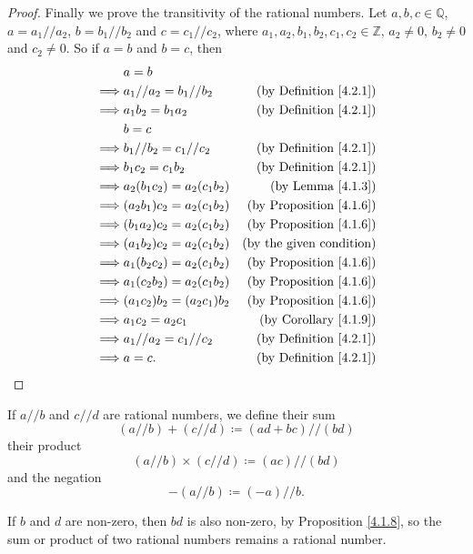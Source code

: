 \begin{proof}
Finally we prove the transitivity of the rational numbers.
Let \(a, b, c \in \mathds{Q}\), \(a = a_1 // a_2\), \(b = b_1 // b_2\) and \(c = c_1 // c_2\), where \(a_1, a_2, b_1, b_2, c_1, c_2 \in \mathds{Z}\), \(a_2 \neq 0\), \(b_2 \neq 0\) and \(c_2 \neq 0\).
So if \(a = b\) and \(b = c\), then
\begin{align*}
& a = b \\
\implies & a_1 // a_2 = b_1 // b_2 & \text{(by Definition \ref{4.2.1})} \\
\implies & a_1b_2 = b_1a_2 & \text{(by Definition \ref{4.2.1})} \\
& b = c \\
\implies & b_1 // b_2 = c_1 // c_2 & \text{(by Definition \ref{4.2.1})} \\
\implies & b_1c_2 = c_1b_2 & \text{(by Definition \ref{4.2.1})} \\
\implies & a_2(b_1c_2) = a_2(c_1b_2) & \text{(by Lemma \ref{4.1.3})} \\
\implies & (a_2b_1)c_2 = a_2(c_1b_2) & \text{(by Proposition \ref{4.1.6})} \\
\implies & (b_1a_2)c_2 = a_2(c_1b_2) & \text{(by Proposition \ref{4.1.6})} \\
\implies & (a_1b_2)c_2 = a_2(c_1b_2) & \text{(by the given condition)} \\
\implies & a_1(b_2c_2) = a_2(c_1b_2) & \text{(by Proposition \ref{4.1.6})} \\
\implies & a_1(c_2b_2) = a_2(c_1b_2) & \text{(by Proposition \ref{4.1.6})} \\
\implies & (a_1c_2)b_2 = (a_2c_1)b_2 & \text{(by Proposition \ref{4.1.6})} \\
\implies & a_1c_2 = a_2c_1 & \text{(by Corollary \ref{4.1.9})} \\
\implies & a_1 // a_2 = c_1 // c_2 & \text{(by Definition \ref{4.2.1})} \\
\implies & a = c. & \text{(by Definition \ref{4.2.1})}
\end{align*}
\end{proof}

\begin{definition}\label{4.2.2}
If \(a // b\) and \(c // d\) are rational numbers, we define their sum
\[
    (a // b) + (c // d) \coloneqq (ad + bc) // (bd)
\]
their product
\[
    (a // b) \times (c // d) \coloneqq (ac) // (bd)
\]
and the negation
\[
    -(a // b) \coloneqq (-a) // b.
\]
\end{definition}

\begin{note}
If \(b\) and \(d\) are non-zero, then \(bd\) is also non-zero, by Proposition \ref{4.1.8}, so the sum or product of two rational numbers remains a rational number.
\end{note}

